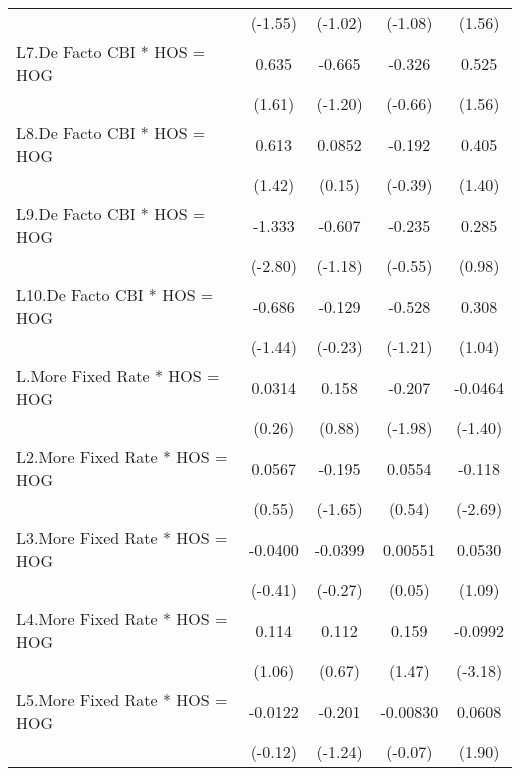{\begin{longtable}{l*{4}{c}}
                &  (-1.55)         &  (-1.02)         &  (-1.08)         &   (1.56)         \\
[1em]
L7.De Facto CBI * HOS = HOG&    0.635         &   -0.665         &   -0.326         &    0.525         \\
                &   (1.61)         &  (-1.20)         &  (-0.66)         &   (1.56)         \\
[1em]
L8.De Facto CBI * HOS = HOG&    0.613         &   0.0852         &   -0.192         &    0.405         \\
                &   (1.42)         &   (0.15)         &  (-0.39)         &   (1.40)         \\
[1em]
L9.De Facto CBI * HOS = HOG&   -1.333\sym{**} &   -0.607         &   -0.235         &    0.285         \\
                &  (-2.80)         &  (-1.18)         &  (-0.55)         &   (0.98)         \\
[1em]
L10.De Facto CBI * HOS = HOG&   -0.686         &   -0.129         &   -0.528         &    0.308         \\
                &  (-1.44)         &  (-0.23)         &  (-1.21)         &   (1.04)         \\
[1em]
L.More Fixed Rate * HOS = HOG&   0.0314         &    0.158         &   -0.207\sym{*}  &  -0.0464         \\
                &   (0.26)         &   (0.88)         &  (-1.98)         &  (-1.40)         \\
[1em]
L2.More Fixed Rate * HOS = HOG&   0.0567         &   -0.195         &   0.0554         &   -0.118\sym{**} \\
                &   (0.55)         &  (-1.65)         &   (0.54)         &  (-2.69)         \\
[1em]
L3.More Fixed Rate * HOS = HOG&  -0.0400         &  -0.0399         &  0.00551         &   0.0530         \\
                &  (-0.41)         &  (-0.27)         &   (0.05)         &   (1.09)         \\
[1em]
L4.More Fixed Rate * HOS = HOG&    0.114         &    0.112         &    0.159         &  -0.0992\sym{**} \\
                &   (1.06)         &   (0.67)         &   (1.47)         &  (-3.18)         \\
[1em]
L5.More Fixed Rate * HOS = HOG&  -0.0122         &   -0.201         & -0.00830         &   0.0608         \\
                &  (-0.12)         &  (-1.24)         &  (-0.07)         &   (1.90)         \\

\end{longtable}}
